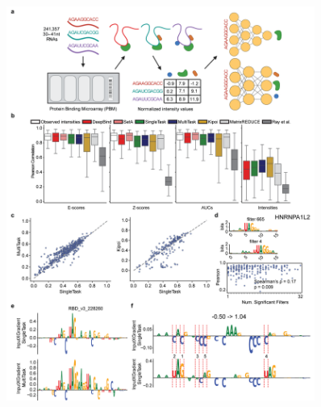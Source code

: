 \begin{figure}[p]
    \centering
    \includegraphics[width=0.9\textwidth, height=0.745\textheight]{1_figures-and-files/extended_data_figure1.png}

\end{figure}
